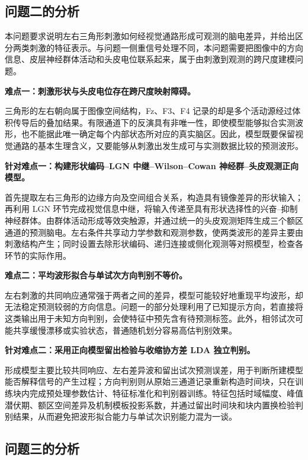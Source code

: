 \documentclass[a4paper,zihao=-4,linespread=1]{ctexart}
\numberwithin{figure}{section}       %
\begin{document}
\subsection{问题二的分析}

本问题要求说明左右三角形刺激如何经视觉通路形成可观测的脑电差异，并给出区分两类刺激的特征表示。与问题一侧重信号处理不同，本问题需要把图像中的方向信息、皮层神经群体活动和头皮电位联系起来，属于由刺激到观测的跨尺度建模问题。

\noindent\textbf{难点一：刺激形状与头皮电位存在跨尺度映射障碍。}

三角形的左右朝向属于图像空间结构，Fz、F3、F4 记录的却是多个活动源经过体积传导后的叠加结果。有限通道下的反演具有非唯一性，即使模型能够拟合实测波形，也不能据此唯一确定每个内部状态所对应的真实脑区。因此，模型既要保留视觉通路的基本生理含义，又要能够从刺激出发生成可与实测数据比较的预测波形。

\noindent\textbf{针对难点一：构建形状编码--LGN 中继--Wilson--Cowan 神经群--头皮观测正向模型。}

首先提取左右三角形的边缘方向及空间组合关系，构造具有镜像差异的形状输入；再利用 LGN 环节完成视觉信息中继，将输入传递至具有形状选择性的兴奋--抑制神经群体。由群体活动形成等效突触源，并通过统一的头皮观测矩阵生成三个额区通道的预测脑电。左右条件共享动力学参数和观测参数，使两类波形的差异主要由刺激结构产生；同时设置去除形状编码、递归连接或侧化观测等对照模型，检查各环节的实际作用。

\noindent\textbf{难点二：平均波形拟合与单试次方向判别不等价。}

左右刺激的共同响应通常强于两者之间的差异，模型可能较好地重现平均波形，却无法稳定预测较弱的方向信息。问题一的部分处理利用了已知提示方向，若直接将这类输出用于未知方向判别，会使特征中预先含有待预测标签。此外，相邻试次可能共享缓慢漂移或实验状态，普通随机划分容易高估判别效果。

\noindent\textbf{针对难点二：采用正向模型留出检验与收缩协方差 LDA 独立判别。}

形成模型主要比较共同响应、左右差异波和留出试次预测误差，用于判断所建模型能否解释信号的产生过程；方向判别则从原始三通道记录重新构造时间块，只在训练块内完成预处理参数估计、特征标准化和判别器训练。特征包括时域幅度、峰值潜伏期、额区空间差异及机制模板投影系数，并通过留出时间块和块内置换检验判别结果，从而避免把波形拟合能力与单试次识别能力混为一谈。

\subsection{问题三的分析}
\end{document}
